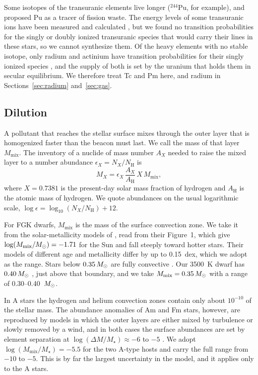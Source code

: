 \documentclass[final,5p]{elsarticle}
\begin{document}
Some isotopes of the transuranic elements live longer ($^{244}$Pu, for example), and \citet{Whitmire1980} proposed Pu as a tracer of fission waste. The energy levels of some transuranic ions have been measured and calculated \citep[for Pu~\textsc{ii},][]{Savukov2020}, but we found no transition probabilities for the singly or doubly ionized transuranic species that would carry their lines in these stars, so we cannot synthesize them. Of the heavy elements with no stable isotope, only radium and actinium have transition probabilities for their singly ionized species \citep{NIST2024}, and the supply of both is set by the uranium that holds them in secular equilibrium. We therefore treat Tc and Pm here, and radium in Sections~\ref{sec:radium} and~\ref{sec:gas}.

\subsection{Dilution}
\label{sec:dilution}

A pollutant that reaches the stellar surface mixes through the outer layer that is homogenized faster than the beacon must last. We call the mass of that layer $M_\mathrm{mix}$. The inventory of a nuclide of mass number $A_X$ needed to raise the mixed layer to a number abundance $\epsilon_X = N_X/N_\mathrm{H}$ is
\begin{equation}
M_X = \epsilon_X \, \frac{A_X}{A_\mathrm{H}} \, X \, M_\mathrm{mix} ,
\label{eq:inventory}
\end{equation}
where $X = 0.7381$ is the present-day solar mass fraction of hydrogen \citep{Asplund2009} and $A_\mathrm{H}$ is the atomic mass of hydrogen. We quote abundances on the usual logarithmic scale, $\log\epsilon = \log_{10}(N_X/N_\mathrm{H}) + 12$.

For FGK dwarfs, $M_\mathrm{mix}$ is the mass of the surface convection zone. We take it from the solar-metallicity models of \citet{Pinsonneault2001}, read from their Figure~1, which give $\log(M_\mathrm{mix}/M_\odot) = -1.71$ for the Sun and fall steeply toward hotter stars. Their models of different age and metallicity differ by up to 0.15~dex, which we adopt as the range. Stars below $0.35\,M_\odot$ are fully convective \citep{ChabrierBaraffe1997}. Our 3500~K dwarf has $0.40\,M_\odot$ \citep{PecautMamajek2013}, just above that boundary, and we take $M_\mathrm{mix} = 0.35\,M_\odot$ with a range of 0.30--0.40~$M_\odot$.

In A stars the hydrogen and helium convection zones contain only about $10^{-10}$ of the stellar mass. The abundance anomalies of Am and Fm stars, however, are reproduced by models in which the outer layers are either mixed by turbulence \citep{Richer2000} or slowly removed by a wind, and in both cases the surface abundances are set by element separation at $\log(\Delta M/M_\star) \approx -6$ to $-5$ \citep{Vick2010}. We adopt $\log(M_\mathrm{mix}/M_\star) = -5.5$ for the two A-type hosts and carry the full range from $-10$ to $-5$. This is by far the largest uncertainty in the model, and it applies only to the A stars.
\end{document}
